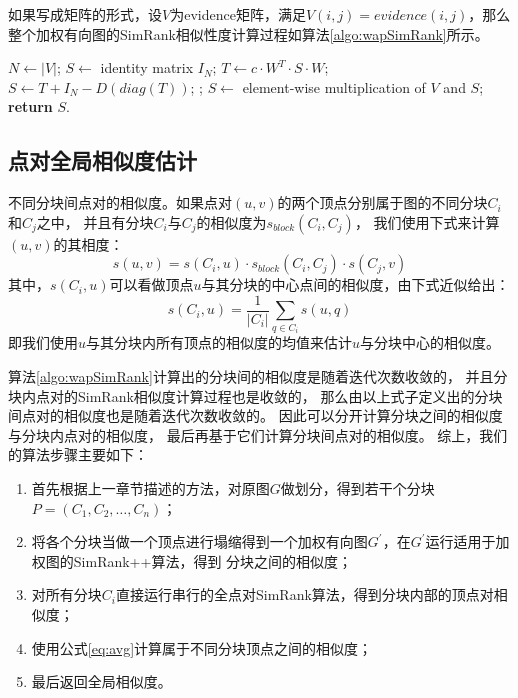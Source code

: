 \documentclass[master]{njuthesis}
\begin{document}
如果写成矩阵的形式，设$V$为evidence矩阵，满足$V(i,j)=evidence(i,j)$，那么整个加权有向图的SimRank相似性度计算过程如算法\ref{algo:wapSimRank}所示。
\begin{algorithm}[h]
\label{algo:wapSimRank}
\begin{algorithmic}[1]
	\State $N \gets |V|$;
	\State $S \gets$ identity matrix $I_N$;
		\State $T \gets c\cdot W^T \cdot S \cdot W$;
		\State $S \gets T + I_N -D(diag(T))$; ;
	\EndFor
	\State $S \gets$ element-wise multiplication of $V$ and $S$;
	\State \textbf{return} $S$.
\EndProcedure
\end{algorithmic}
\end{algorithm}
\subsection{点对全局相似度估计}

\begin{definition}
 不同分块间点对的相似度。如果点对$(u,v)$的两个顶点分别属于图的不同分块$C_i$和$C_j$之中，
 并且有分块$C_i$与$C_j$的相似度为$s_{block}(C_i, C_j)$，
 我们使用下式来计算$(u,v)$的其相度：
 \begin{equation}
 \label{eq:avg}
    s(u,v) = s(C_i, u) \cdot s_{block}(C_i, C_j) \cdot s(C_j, v)
   \end{equation}
  其中，$s(C_i, u)$可以看做顶点$u$与其分块的中心点间的相似度，由下式近似给出：
  \begin{equation}
    s(C_i, u) = \frac{1}{|C_i|}\sum_{q \in C_i}{s(u,q)}
   \end{equation}
   即我们使用$u$与其分块内所有顶点的相似度的均值来估计$u$与分块中心的相似度。
\end{definition}
算法\ref{algo:wapSimRank}计算出的分块间的相似度是随着迭代次数收敛的\cite{DBLP:journals/pvldb/AntonellisGC08}，
并且分块内点对的SimRank相似度计算过程也是收敛的\cite{jeh2002simrank}，
那么由以上式子定义出的分块间点对的相似度也是随着迭代次数收敛的。
因此可以分开计算分块之间的相似度与分块内点对的相似度，
最后再基于它们计算分块间点对的相似度。
综上，我们的算法步骤主要如下：
\begin{enumerate}
 \item 首先根据上一章节描述的方法，对原图$G$做划分，得到若干个分块$P=(C_1, C_2, \dots, C_n)$；
 \item 将各个分块当做一个顶点进行塌缩得到一个加权有向图$G^\prime$，在$G^\prime$运行适用于加权图的SimRank++算法，得到
 分块之间的相似度；
 \item 对所有分块$C_i$直接运行串行的全点对SimRank算法，得到分块内部的顶点对相似度；
 \item 使用公式\ref{eq:avg}计算属于不同分块顶点之间的相似度；
 \item 最后返回全局相似度。
\end{enumerate}
\end{document}
